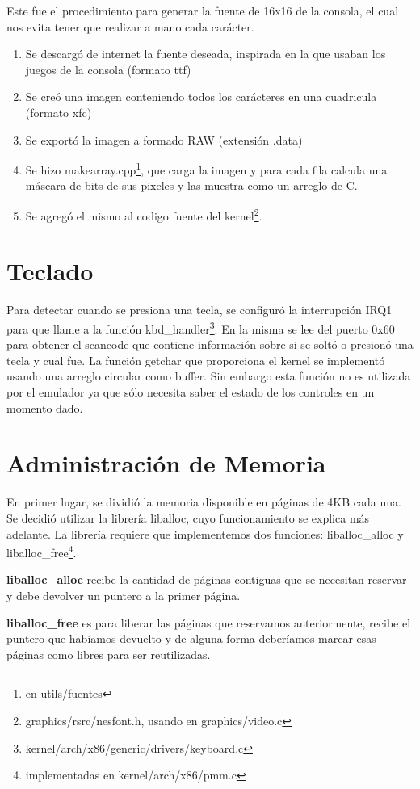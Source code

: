 Este fue el procedimiento para generar la fuente de 16x16 de la consola, el cual nos evita tener que realizar a mano cada carácter.
\begin{enumerate}
\item Se descargó de internet la fuente deseada, inspirada en la que usaban los juegos de la consola (formato ttf)
\item Se creó una imagen conteniendo todos los carácteres en una cuadricula (formato xfc)
\item Se exportó la imagen a formado RAW (extensión .data)
\item Se hizo makearray.cpp\footnote{en utils/fuentes}, que carga la imagen y para cada fila calcula una máscara de bits de sus pixeles y las muestra como un arreglo de C.
\item Se agregó el mismo al codigo fuente del kernel\footnote{graphics/rsrc/nesfont.h, usando en graphics/video.c}.	
\end{enumerate}

\section{Teclado}\label{sec:teclado}
Para detectar cuando se presiona una tecla, se configuró la interrupción IRQ1 para que llame a la función kbd\_handler\footnote{kernel/arch/x86/generic/drivers/keyboard.c}. En la misma se lee del puerto 0x60 para obtener el scancode que contiene información sobre si se soltó o presionó una tecla y cual fue.
La función getchar que proporciona el kernel se implementó usando una arreglo circular como buffer. Sin embargo esta función no es utilizada por el emulador ya que sólo necesita saber el estado de los controles en un momento dado.

\section{Administración de Memoria}\label{sec:memory}
En primer lugar, se dividió la memoria disponible en páginas de 4KB cada una. Se decidió utilizar la librería liballoc, cuyo funcionamiento se explica más adelante. La librería requiere que implementemos dos funciones: liballoc\_alloc y liballoc\_free\footnote{implementadas en kernel/arch/x86/pmm.c}.

\textbf{liballoc\_alloc} recibe la cantidad de páginas contiguas que se necesitan reservar y debe devolver un puntero a la primer página.

\textbf{liballoc\_free} es para liberar las páginas que reservamos anteriormente, recibe el puntero que habíamos devuelto y de alguna forma deberíamos marcar esas páginas como libres para ser reutilizadas.

